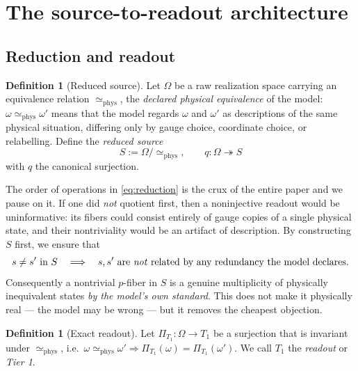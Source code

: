 \documentclass[11pt,reqno]{amsart}
\theoremstyle{plain}
\theoremstyle{definition}
\newtheorem{definition}[theorem]{Definition}
\theoremstyle{remark}
\begin{document}
\section{The source-to-readout architecture}\label{sec:architecture}

\subsection{Reduction and readout}

\begin{definition}[Reduced source]\label{def:source}
Let $\Omega$ be a raw realization space carrying an equivalence relation $\simeq_{\mathrm{phys}}$, the \emph{declared physical equivalence} of the model: $\omega\simeq_{\mathrm{phys}}\omega'$ means that the model regards $\omega$ and $\omega'$ as descriptions of the same physical situation, differing only by gauge choice, coordinate choice, or relabelling. Define the \emph{reduced source}
\begin{equation}\label{eq:reduction}
S:=\Omega/\!\simeq_{\mathrm{phys}},\qquad q\colon\Omega\twoheadrightarrow S
\end{equation}
with $q$ the canonical surjection.
\end{definition}

The order of operations in \eqref{eq:reduction} is the crux of the entire paper and we pause on it. If one did \emph{not} quotient first, then a noninjective readout would be uninformative: its fibers could consist entirely of gauge copies of a single physical state, and their nontriviality would be an artifact of description. By constructing $S$ first, we ensure that
\begin{equation}\label{eq:noGauge}
s\neq s'\ \text{in}\ S\quad\Longrightarrow\quad s,s'\ \text{are \emph{not} related by any redundancy the model declares.}
\end{equation}
Consequently a nontrivial $p$-fiber in $S$ is a genuine multiplicity of physically inequivalent states \emph{by the model's own standard}. This does not make it physically real --- the model may be wrong --- but it removes the cheapest objection.

\begin{definition}[Exact readout]\label{def:readout}
Let $\Pi_{T_1}\colon\Omega\to T_1$ be a surjection that is invariant under $\simeq_{\mathrm{phys}}$, i.e.\ $\omega\simeq_{\mathrm{phys}}\omega'\Rightarrow\Pi_{T_1}(\omega)=\Pi_{T_1}(\omega')$. We call $T_1$ the \emph{readout} or \emph{Tier 1}.
\end{definition}
\end{document}
